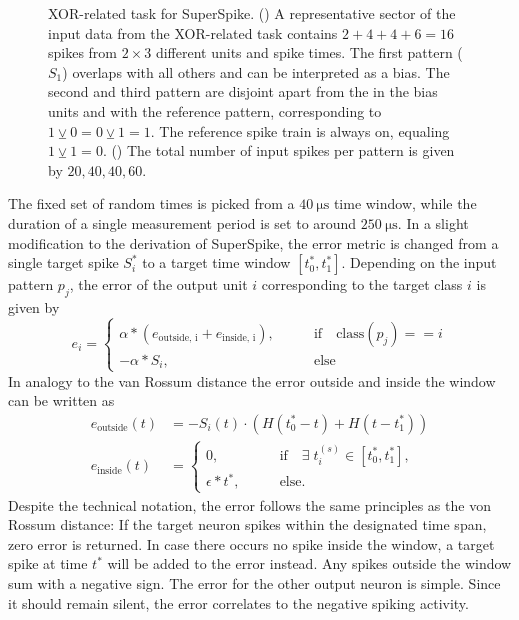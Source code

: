 \begin{figure}	
	\begin{subfigure}{0.5\textwidth}
		\caption{}
		
		\label{superspiketaskpicturesector}
	\end{subfigure}
	\begin{subfigure}{0.5\textwidth}
		\caption{}
		
		\label{superspiketaskpicture}
	\end{subfigure}
	\caption[XOR-related task for SuperSpike.]{XOR-related task for SuperSpike. () A representative sector of the input data from the XOR-related task contains $2 + 4 + 4 + 6 = 16$ spikes from $2\times3$ different units and spike times. The first pattern ($S_1$) overlaps with all others and can be interpreted as a bias. The second and third pattern are disjoint apart from the  in the bias units and with the reference pattern, corresponding to $1 \veebar 0 = 0 \veebar 1 = 1$. The reference spike train is always on, equaling $1 \veebar 1 = 0$. () The total number of input spikes per pattern is given by $20, 40, 40, 60$.
	\label{superspiketaskoverview}}
\end{figure} 

The fixed set of random times is picked from a $\SI{40}{\micro \s}$ time window, while the duration of a single measurement period is set to around $\SI{250}{\micro \s}$. In a slight modification to the derivation of SuperSpike, the error metric is changed from a single target spike $S_i^*$ to a target time window $[t^*_0, t^*_1]$. Depending on the input pattern $p_j$, the error of the output unit $i$ corresponding to the target class $i$ is given by
\begin{equation}
e_i = \begin{cases}
\alpha \ast \left(e_\text{outside, i} + e_\text{inside, i}\right),& \quad \quad \text{if} \quad \text{class}(p_j) == i \\
- \alpha \ast S_i,& \quad \quad \text{else} 
\end{cases}
\label{superspikeerror}
\end{equation}
In analogy to the van Rossum distance the error outside and inside the window can be written as 
\begin{align*}
e_\text{outside}(t) &= - S_i(t) \cdot \left(H(t^*_0 - t) + H(t - t^*_1)\right) \\
e_\text{inside}(t) &= 
\begin{cases}
0 ,&\quad \quad \text{if} \quad \exists \; t^{(s)}_i \in [t^*_0, t^*_1], \\
\epsilon \ast t^* ,& \quad \quad \text{else}.
\end{cases}
\end{align*}
Despite the technical notation, the error follows the same principles as the von Rossum distance: If the target neuron spikes within the designated time span, zero error is returned. In case there occurs no spike inside the window, a target spike at time $t^*$ will be added to the error instead. Any spikes outside the window sum with a negative sign. The error for the other output neuron is simple. Since it should remain silent, the error correlates to the negative spiking activity.

